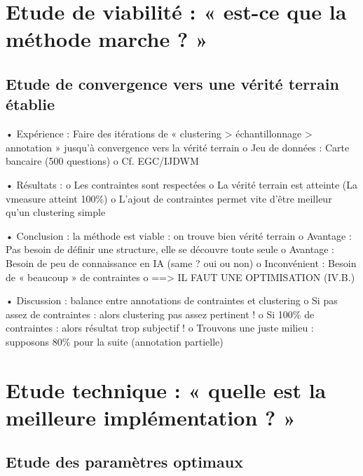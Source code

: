     \section{Etude de viabilité : « est-ce que la méthode marche ? »}

        \subsection{Etude de convergence vers une vérité terrain établie}

        •	Expérience : Faire des itérations de « clustering > échantillonnage > annotation » jusqu’à convergence vers la vérité terrain
            o	Jeu de données : Carte bancaire (500 questions)
            o	Cf. EGC/IJDWM

        •	Résultats :
            o	Les contraintes sont respectées
            o	La vérité terrain est atteinte (La vmeasure atteint 100\%)
            o	L’ajout de contraintes permet vite d’être meilleur qu’un clustering simple

        •	Conclusion : la méthode est viable : on trouve bien vérité terrain
            o	Avantage : Pas besoin de définir une structure, elle se découvre toute seule
            o	Avantage : Besoin de peu de connaissance en IA (same ? oui ou non)
            o	Inconvénient : Besoin de « beaucoup » de contraintes
            o	==> IL FAUT UNE OPTIMISATION (IV.B.)

        •	Discussion : balance entre annotations de contraintes et clustering
            o	Si pas assez de contraintes : alors clustering pas assez pertinent !
            o	Si 100\% de contraintes : alors résultat trop subjectif !
            o	Trouvons une juste milieu : supposons 80\% pour la suite (annotation partielle)

    
    \section{Etude technique : « quelle est la meilleure implémentation ? »}

        \subsection{Etude des paramètres optimaux}

